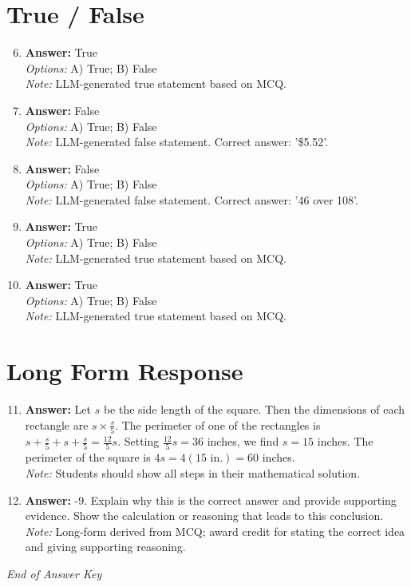 \documentclass[12pt]{article}
\begin{document}
\section*{True / False}
\begin{enumerate}[label=\arabic*.]
\setcounter{enumi}{5}
\item \textbf{Answer:} True
\\ \textit{Options:} A) True; B) False
\\ \textit{Note:} LLM-generated true statement based on MCQ.
\item \textbf{Answer:} False
\\ \textit{Options:} A) True; B) False
\\ \textit{Note:} LLM-generated false statement. Correct answer: '\$5.52'.
\item \textbf{Answer:} False
\\ \textit{Options:} A) True; B) False
\\ \textit{Note:} LLM-generated false statement. Correct answer: '46 over 108'.
\item \textbf{Answer:} True
\\ \textit{Options:} A) True; B) False
\\ \textit{Note:} LLM-generated true statement based on MCQ.
\item \textbf{Answer:} True
\\ \textit{Options:} A) True; B) False
\\ \textit{Note:} LLM-generated true statement based on MCQ.
\end{enumerate}

\section*{Long Form Response}
\begin{enumerate}[label=\arabic*.]
\setcounter{enumi}{10}
\item \textbf{Answer:} Let $s$ be the side length of the square. Then the dimensions of each rectangle are $s\times\frac{s}{5}$. The perimeter of one of the rectangles is $s+\frac{s}{5}+s+\frac{s}{5}=\frac{12}{5}s$. Setting $\frac{12}{5}s=36$ inches, we find $s=15$ inches. The perimeter of the square is $4 s=4(15\text{ in.})=\boxed{60}$ inches.
\\ \textit{Note:} Students should show all steps in their mathematical solution.
\item \textbf{Answer:} -9. Explain why this is the correct answer and provide supporting evidence. Show the calculation or reasoning that leads to this conclusion.
\\ \textit{Note:} Long-form derived from MCQ; award credit for stating the correct idea and giving supporting reasoning.
\end{enumerate}

\vfill
\noindent\textit{End of Answer Key}
\end{document}
